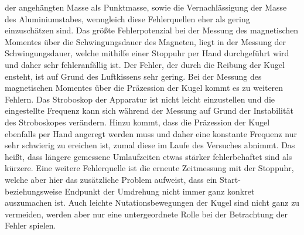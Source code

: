 der angehängten Masse als Punktmasse, sowie die Vernachlässigung der Masse des Aluminiumstabes, wenngleich diese Fehlerquellen eher 
als gering einzuschätzen sind.
Das größte Fehlerpotenzial bei der Messung des magnetischen Momentes über die Schwingungsdauer des Magneten, liegt in der Messung der 
Schwingungsdauer, welche mithilfe einer Stoppuhr per Hand durchgeführt wird und daher sehr fehleranfällig ist.
Der Fehler, der durch die Reibung der Kugel ensteht, ist auf Grund des Luftkissens sehr gering.
Bei der Messung des magnetischen Momentes über die Präzession der Kugel kommt es zu weiteren Fehlern. Das Stroboskop der 
Apparatur ist nicht leicht einzustellen und die eingestellte Frequenz kann sich während der Messung auf Grund der Instabilität des
Stroboskopes verändern.
Hinzu kommt, dass die Präzession der Kugel ebenfalls per Hand angeregt werden muss und daher eine konstante Frequenz nur sehr
schwierig zu ereichen ist, zumal diese im Laufe des Versuches abnimmt. Das heißt, dass längere gemessene Umlaufzeiten etwas stärker 
fehlerbehaftet sind als kürzere. Eine weitere Fehlerquelle ist die erneute Zeitmessung mit der Stoppuhr, welche aber hier
das zusätzliche Problem aufweist, dass ein Start- beziehungsweise Endpunkt der Umdrehung nicht immer ganz konkret auszumachen ist.
Auch leichte Nutationsbewegungen der Kugel sind nicht ganz zu vermeiden, werden aber nur eine untergeordnete Rolle bei der Betrachtung
der Fehler spielen.